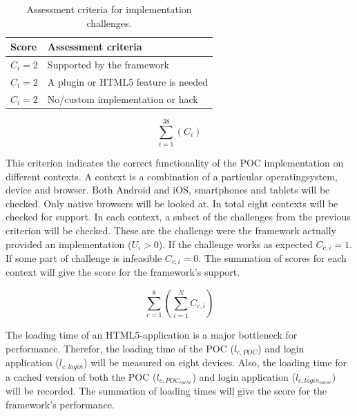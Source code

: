 \documentclass[a4paper]{artikel3}
\newcommand{\setspace}[0]{\vspace{2mm}}
\renewcommand{\paragraph}[1]{\setspace \noindent {\bf #1}  }
\begin{document}
\begin{table}[h]	
\centering
\begin{tabular}{ll}
\toprule
\textbf{Score} & \textbf{Assessment criteria}\\
\midrule
$C_{i} = 2$ & Supported by the framework\\
$C_{i} = 2$ & A plugin or HTML5 feature is needed\\
$C_{i} = 2$ & No/custom implementation or hack\\
\bottomrule
\end{tabular}
\caption{Assessment criteria for implementation challenges.}
\label{table:challenges-scores}
\end{table}

\begin{equation}
  \sum_{i=1}^{38}{\left(C_{i}\right)}
  \label{eq:gebruik}
\end{equation}

\paragraph{Support}
This criterion indicates the correct functionality of the POC implementation on different contexts.
A context is a combination of a particular operatingsystem, device and browser.
Both Android and iOS, smartphones and tablets will be checked.
Only native browsers will be looked at.
In total eight contexts will be checked for support.
In each context,  a subset of the challenges from the previous criterion will be checked.  
These are the challenge were the framework actually provided an implementation ($U_{i} > 0$).
If the challenge works as expected $C_{c,i} = 1$.
If some part of challenge is infeasible $C_{c,i} = 0$.
The summation of scores for each context will give the score for the framework's support.

\begin{equation}
  \sum_{c=1}^{8}{\left(\sum_{i=1}^{N}C_{c,i}\right)}
  \label{eq:ondersteuning}
\end{equation}

\paragraph{Performance}
The loading time of an HTML5-application is a major bottleneck for performance.
Therefor,  the loading time of the POC ($l_{c,POC}$) and login application ($l_{c,login}$) will be measured on eight devices.
Also,  the loading time for a cached version of both the POC ($l_{c,POC_{cache}}$) and login application ($l_{c,login_{cache}}$) will be recorded.
The summation of loading times will give the score for the framework's performance.
\end{document}
